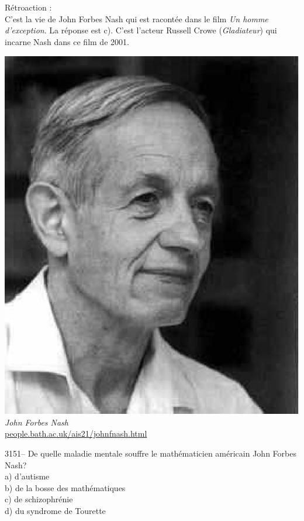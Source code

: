 \documentclass[letterpaper, 12pt]{article}
\begin{document}
R\'etroaction :\\
C'est la vie de John Forbes Nash qui est racont\'ee dans le film \og\emph{Un homme d'exception}\fg. La r\'eponse est c). C'est l'acteur Russell Crowe (\og\emph{Gladiateur}\fg) qui incarne Nash dans ce film de 2001.
\begin{center}
\includegraphics[scale=0.4]{nash.eps}\\
\emph{{\small John Forbes Nash}}\\
\href{http://people.bath.ac.uk/ais21/johnfnash.html}{people.bath.ac.uk/ais21/johnfnash.html}\\[5mm]
\end{center}



3151-- De quelle maladie mentale souffre le math\'ematicien am\'ericain John Forbes Nash?\\

a) d'autisme\\
b) de la bosse des math\'ematiques\\
c) de schizophr\'enie\\
d) du syndrome de Tourette\\
\end{document}
